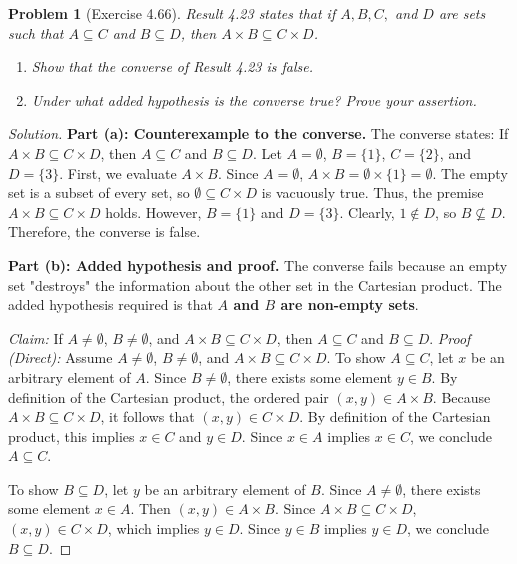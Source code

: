 \documentclass[11pt]{article}
\newtheorem{problem}{Problem}
\begin{document}
\begin{problem}[Exercise 4.66]
Result 4.23 states that if $A, B, C,$ and $D$ are sets such that $A \subseteq C$ and $B \subseteq D$, then $A \times B \subseteq C \times D$.
\begin{enumerate}
    \item[(a)] Show that the converse of Result 4.23 is false.
    \item[(b)] Under what added hypothesis is the converse true? Prove your assertion.
\end{enumerate}
\end{problem}
\begin{proof}[Solution]
\textbf{Part (a): Counterexample to the converse.}
The converse states: If $A \times B \subseteq C \times D$, then $A \subseteq C$ and $B \subseteq D$.
Let $A = \emptyset$, $B = \{1\}$, $C = \{2\}$, and $D = \{3\}$.
First, we evaluate $A \times B$. Since $A = \emptyset$, $A \times B = \emptyset \times \{1\} = \emptyset$.
The empty set is a subset of every set, so $\emptyset \subseteq C \times D$ is vacuously true. Thus, the premise $A \times B \subseteq C \times D$ holds.
However, $B = \{1\}$ and $D = \{3\}$. Clearly, $1 \notin D$, so $B \not\subseteq D$. 
Therefore, the converse is false.

\textbf{Part (b): Added hypothesis and proof.}
The converse fails because an empty set "destroys" the information about the other set in the Cartesian product. The added hypothesis required is that \textbf{$A$ and $B$ are non-empty sets}.

\textit{Claim:} If $A \neq \emptyset$, $B \neq \emptyset$, and $A \times B \subseteq C \times D$, then $A \subseteq C$ and $B \subseteq D$.
\textit{Proof (Direct):} Assume $A \neq \emptyset$, $B \neq \emptyset$, and $A \times B \subseteq C \times D$.
To show $A \subseteq C$, let $x$ be an arbitrary element of $A$. 
Since $B \neq \emptyset$, there exists some element $y \in B$. 
By definition of the Cartesian product, the ordered pair $(x, y) \in A \times B$. 
Because $A \times B \subseteq C \times D$, it follows that $(x, y) \in C \times D$. 
By definition of the Cartesian product, this implies $x \in C$ and $y \in D$. 
Since $x \in A$ implies $x \in C$, we conclude $A \subseteq C$.

To show $B \subseteq D$, let $y$ be an arbitrary element of $B$. 
Since $A \neq \emptyset$, there exists some element $x \in A$. 
Then $(x, y) \in A \times B$. 
Since $A \times B \subseteq C \times D$, $(x, y) \in C \times D$, which implies $y \in D$. 
Since $y \in B$ implies $y \in D$, we conclude $B \subseteq D$.
\end{proof}
\end{document}
